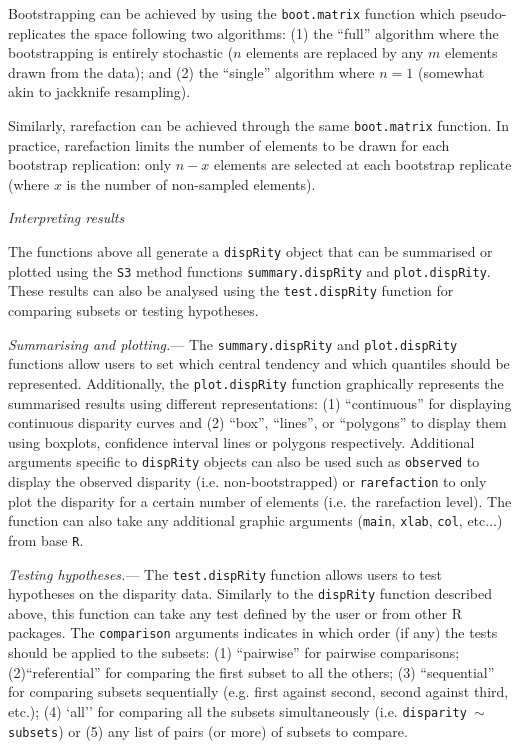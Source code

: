 \documentclass[12pt,letterpaper]{article}
\renewcommand{\subsection}[1]{%
\bigskip
\begin{center}
\begin{large}
\normalfont\itshape #1
\end{large}
\end{center}}
\renewcommand{\subsubsection}[1]{%
\vspace{2ex}
\noindent
\textit{#1.}---}
\newcommand{\disp}{\texttt{dispRity} }
\begin{document}
Bootstrapping can be achieved by using the \texttt{boot.matrix} function which pseudo-replicates the space following two algorithms: (1) the ``full'' algorithm where the bootstrapping is entirely stochastic ($n$ elements are replaced by any $m$ elements drawn from the data); and (2) the ``single'' algorithm where $n = 1$ (somewhat akin to jackknife resampling).

Similarly, rarefaction can be achieved through the same \texttt{boot.matrix} function.
In practice, rarefaction limits the number of elements to be drawn for each bootstrap replication: only $n-x$ elements are selected at each bootstrap replicate (where $x$ is the number of non-sampled elements).

\subsection{Interpreting results}
The functions above all generate a \disp object that can be summarised or plotted using the \texttt{S3} method functions \texttt{summary.dispRity} and \texttt{plot.dispRity}.
These results can also be analysed using the \texttt{test.dispRity} function for comparing subsets or testing hypotheses.

\subsubsection{Summarising and plotting}
The \texttt{summary.dispRity} and \texttt{plot.dispRity} functions allow users to set which central tendency and which quantiles should be represented.
Additionally, the \texttt{plot.dispRity} function graphically represents the summarised results using different representations: (1) ``continuous'' for displaying continuous disparity curves and (2) ``box'', ``lines'', or ``polygons'' to display them using boxplots, confidence interval lines or polygons respectively.
Additional arguments specific to \disp objects can also be used such as \texttt{observed} to display the observed disparity (i.e. non-bootstrapped) or \texttt{rarefaction} to only plot the disparity for a certain number of elements (i.e. the rarefaction level).
The function can also take any additional graphic arguments (\texttt{main}, \texttt{xlab}, \texttt{col}, etc...) from base \texttt{R}.

\subsubsection{Testing hypotheses}
The \texttt{test.dispRity} function allows users to test hypotheses on the disparity data.
Similarly to the \disp function described above, this function can take any test defined by the user or from other R packages.
The \texttt{comparison} arguments indicates in which order (if any) the tests should be applied to the subsets: (1) ``pairwise'' for pairwise comparisons; (2)``referential'' for comparing the first subset to all the others; (3) ``sequential'' for comparing subsets sequentially (e.g. first against second, second against third, etc.); (4) `all'' for comparing all the subsets simultaneously (i.e. \texttt{disparity $\mathtt{\sim}$ subsets}) or (5) any list of pairs (or more) of subsets to compare.
\end{document}
